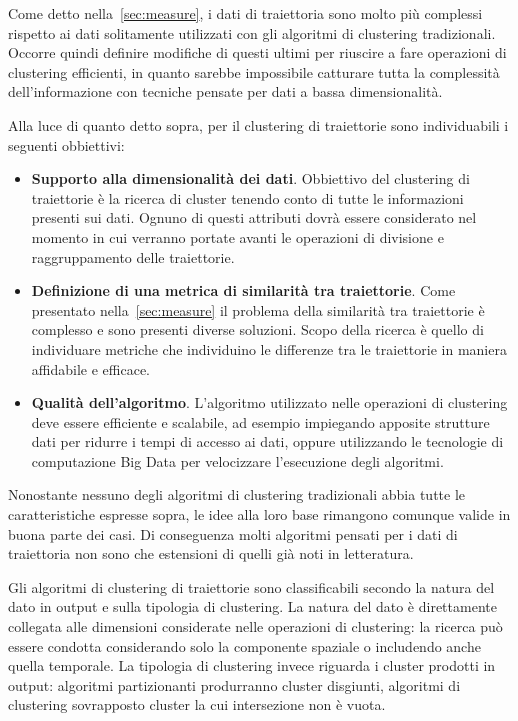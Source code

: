 
Come detto nella~\cref{sec:measure}, i dati di traiettoria sono molto più complessi
rispetto ai dati solitamente utilizzati con gli algoritmi di clustering tradizionali.
Occorre quindi definire modifiche di questi ultimi per riuscire a fare operazioni di clustering
efficienti, in quanto sarebbe impossibile catturare tutta la complessità dell'informazione con
tecniche pensate per dati a bassa dimensionalità.

Alla luce di quanto detto sopra, per il clustering di traiettorie sono individuabili i seguenti obbiettivi:

\begin{itemize}

  \item \textbf{Supporto alla dimensionalità dei dati}.
  Obbiettivo del clustering di traiettorie è la ricerca di cluster tenendo conto di tutte le informazioni presenti sui dati.
  Ognuno di questi attributi dovrà essere considerato nel momento in cui verranno portate avanti le operazioni di divisione e raggruppamento delle traiettorie.

  \item \textbf{Definizione di una metrica di similarità tra traiettorie}.
  Come presentato nella~\cref{sec:measure} il problema della similarità tra traiettorie è complesso e sono presenti diverse soluzioni.
  Scopo della ricerca è quello di individuare metriche che individuino le differenze tra le traiettorie in maniera affidabile e efficace.

  \item \textbf{Qualità dell'algoritmo}.
  L'algoritmo utilizzato nelle operazioni di clustering deve essere efficiente e scalabile, ad esempio impiegando apposite strutture dati per
  ridurre i tempi di accesso ai dati, oppure utilizzando le tecnologie di computazione Big Data per velocizzare l'esecuzione degli algoritmi.

\end{itemize}

Nonostante nessuno degli algoritmi di clustering tradizionali abbia tutte le caratteristiche espresse sopra, le idee alla loro base rimangono comunque
valide in buona parte dei casi.
Di conseguenza molti algoritmi pensati per i dati di traiettoria non sono che estensioni di quelli già noti in letteratura.

Gli algoritmi di clustering di traiettorie sono 
classificabili secondo la natura del dato in output
e sulla tipologia di clustering.
La natura del dato è direttamente collegata alle dimensioni considerate nelle operazioni di clustering:
la ricerca può essere condotta considerando solo la componente spaziale o includendo anche quella temporale.
La tipologia di clustering invece riguarda i cluster prodotti in output: algoritmi partizionanti 
produrranno cluster disgiunti, algoritmi di clustering sovrapposto cluster la cui intersezione non è vuota.

